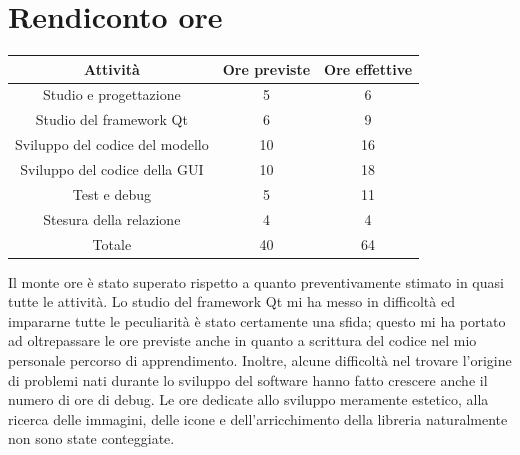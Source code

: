 \documentclass[10pt]{article}
\begin{document}
\section{Rendiconto ore}
\begin{center}
    \begin{tabular}{| c | c | c |} \hline
    Attività & Ore previste & Ore effettive \\\hline
    Studio e progettazione & 5 & 6 \\
    Studio del framework Qt & 6 & 9 \\
    Sviluppo del codice del modello & 10 & 16 \\
    Sviluppo del codice della GUI & 10 & 18 \\
    Test e debug & 5 & 11 \\
    Stesura della relazione & 4 & 4 \\\hline
    Totale & 40 & 64 \\\hline
    \end{tabular}
\end{center}
Il monte ore è stato superato rispetto a quanto preventivamente stimato in quasi tutte le attività. Lo studio del framework Qt mi ha messo in difficoltà ed impararne tutte le peculiarità è stato certamente una sfida; questo mi ha portato ad oltrepassare le ore previste anche in quanto a scrittura del codice nel mio personale percorso di apprendimento. Inoltre, alcune difficoltà nel trovare l'origine di problemi nati durante lo sviluppo del software hanno fatto crescere anche il numero di ore di debug. Le ore dedicate allo sviluppo meramente estetico, alla ricerca delle immagini, delle icone e dell'arricchimento della libreria naturalmente non sono state conteggiate.
\end{document}
